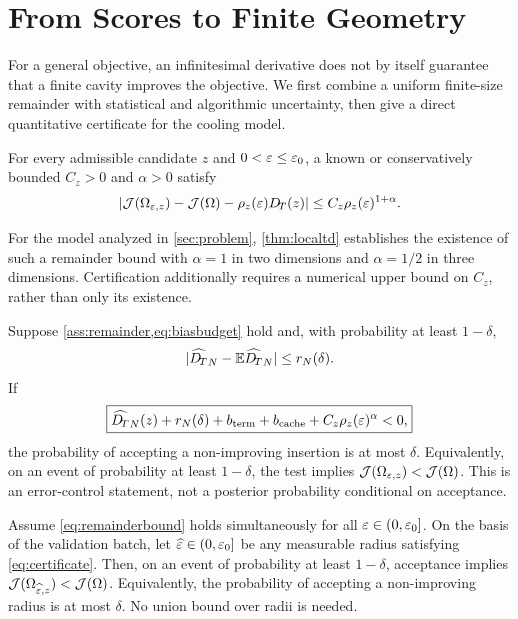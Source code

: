 \section{From Scores to Finite Geometry}
\label{sec:optimization}

For a general objective, an infinitesimal derivative does not by itself guarantee that a finite cavity improves the objective. We first combine a uniform finite-size remainder with statistical and algorithmic uncertainty, then give a direct quantitative certificate for the cooling model.

\begin{assumption}
\label{ass:remainder}
For every admissible candidate $z$ and $0<\varepsilon\le\varepsilon_0$, a known or
conservatively bounded $C_z>0$ and $\alpha>0$ satisfy
\begin{equation}
 \left|\mathcal{J}(\Omega_{\varepsilon,z})-\mathcal{J}(\Omega)
 -\rho_z(\varepsilon)D_{\!T}(z)\right|
 \le C_z\rho_z(\varepsilon)^{1+\alpha}.
 \label{eq:remainderbound}
\end{equation}
\end{assumption}

For the model analyzed in \cref{sec:problem},
\cref{thm:localtd} establishes the existence of such a remainder bound with $\alpha=1$ in two dimensions
and $\alpha=1/2$ in three dimensions.  Certification additionally requires a
numerical upper bound on $C_z$, rather than only its existence.

\begin{theorem}
\label{thm:certificate}
Suppose \cref{ass:remainder,eq:biasbudget} hold and, with probability at least
$1-\delta$,
\begin{equation}
 |\widehat{D_{\!T}}_N-\mathbb{E}\widehat{D_{\!T}}_N|
 \le r_N(\delta).
 \label{eq:validationcoverage}
\end{equation}
If
\begin{equation}
 \boxed{
 \widehat{D_{\!T}}_N(z)+r_N(\delta)
 +b_{\mathrm{term}}+b_{\mathrm{cache}}
 +C_z\rho_z(\varepsilon)^\alpha<0,}
 \label{eq:certificate}
\end{equation}
the probability of accepting a non-improving insertion is at most $\delta$. Equivalently, on an event of probability at least $1-\delta$, the test implies $\mathcal{J}(\Omega_{\varepsilon,z})<\mathcal{J}(\Omega)$. This is an error-control statement, not a posterior probability conditional on acceptance.
\end{theorem}

\begin{corollary}
\label{cor:adaptiveradius}
Assume \cref{eq:remainderbound} holds simultaneously for all
$\varepsilon\in(0,\varepsilon_0]$.  On the basis of the validation batch, let
$\widehat{\varepsilon}\in(0,\varepsilon_0]$ be any measurable radius satisfying
\cref{eq:certificate}.  Then, on an event of probability at least $1-\delta$, acceptance implies
$\mathcal{J}(\Omega_{\widehat{\varepsilon},z})<\mathcal{J}(\Omega)$. Equivalently, the probability of accepting a non-improving radius is at most $\delta$. No union bound over radii is needed.
\end{corollary}

